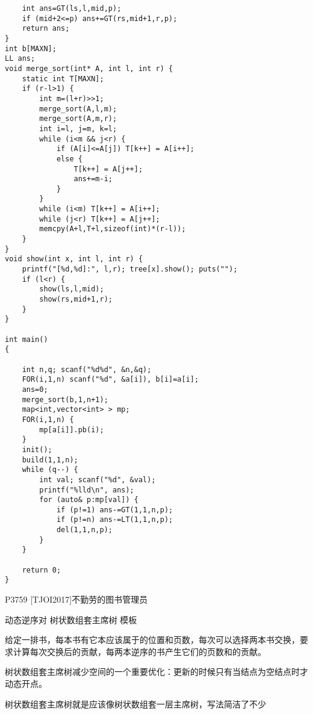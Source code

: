 \begin{lstlisting}
    int ans=GT(ls,l,mid,p);
    if (mid+2<=p) ans+=GT(rs,mid+1,r,p);
    return ans;
}
int b[MAXN];
LL ans;
void merge_sort(int* A, int l, int r) {
    static int T[MAXN];
    if (r-l>1) {
        int m=(l+r)>>1;
        merge_sort(A,l,m);
        merge_sort(A,m,r);
        int i=l, j=m, k=l;
        while (i<m && j<r) {
            if (A[i]<=A[j]) T[k++] = A[i++];
            else {
                T[k++] = A[j++];
                ans+=m-i;
            }
        }
        while (i<m) T[k++] = A[i++];
        while (j<r) T[k++] = A[j++];
        memcpy(A+l,T+l,sizeof(int)*(r-l));
    }
}
void show(int x, int l, int r) {
    printf("[%d,%d]:", l,r); tree[x].show(); puts("");
    if (l<r) {
        show(ls,l,mid);
        show(rs,mid+1,r);
    }
}

int main()
{

    int n,q; scanf("%d%d", &n,&q);
    FOR(i,1,n) scanf("%d", &a[i]), b[i]=a[i];
    ans=0;
    merge_sort(b,1,n+1);
    map<int,vector<int> > mp;
    FOR(i,1,n) {
        mp[a[i]].pb(i);
    }
    init();
    build(1,1,n);
    while (q--) {
        int val; scanf("%d", &val);
        printf("%lld\n", ans);
        for (auto& p:mp[val]) {
            if (p!=1) ans-=GT(1,1,n,p);
            if (p!=n) ans-=LT(1,1,n,p);
            del(1,1,n,p);
        }
    }

    return 0;
}
\end{lstlisting}

P3759 [TJOI2017]不勤劳的图书管理员

动态逆序对 树状数组套主席树 模板

给定一排书，每本书有它本应该属于的位置和页数，每次可以选择两本书交换，要求计算每次交换后的贡献，每两本逆序的书产生它们的页数和的贡献。

树状数组套主席树减少空间的一个重要优化：更新的时候只有当结点为空结点时才动态开点。

树状数组套主席树就是应该像树状数组套一层主席树，写法简洁了不少

